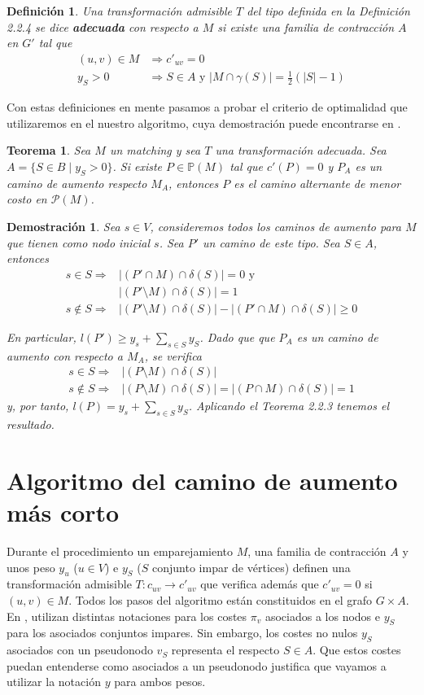 \documentclass[twoside,a4paper,openright,12pt,tikz]{book}
\newtheorem{defi}{Definici\'on}[section]
\newtheorem{thm}{Teorema}[section]
\newtheorem*{dem}{Demostración}
\begin{document}
\begin{defi}
Una transformación admisible $T$ del tipo definida en la Definición 2.2.4 se dice \textbf{adecuada} con respecto a $M$ si existe una familia de contracción $A$ en $G'$ tal que
\begin{align*}
(u,v)\in M &\Rightarrow c'_{uv} = 0\\
y_S>0&\Rightarrow S\in A \text{ y } |M\cap \gamma(S)| = \frac{1}{2}(|S|-1)
\end{align*}
\end{defi}
Con estas definiciones en mente pasamos a probar el criterio de optimalidad que utilizaremos en el nuestro algoritmo, cuya demostración puede encontrarse en \cite{derigs}.
\begin{thm}
Sea $M$ un matching y sea $T$ una transformación adecuada. Sea $A = \{S \in B\mid y_S>0\}$. Si existe $P\in \mathbb{P}(M)$ tal que $c'(P)=0$ y $P_A$ es un camino de aumento respecto $M_A$, entonces $P$ es el camino alternante de menor costo en $\mathcal{P}(M)$.
\end{thm}
\begin{dem}
Sea $s\in V$, consideremos todos los caminos de aumento para $M$ que tienen como nodo inicial $s$. Sea $P'$ un camino de este tipo. Sea $S\in A$, entonces
\begin{align*}
s\in S \Rightarrow & |(P'\cap M)\cap \delta(S)| = 0 \text{ y}\\
& |(P'\setminus M)\cap \delta(S)| = 1\\
s\notin S \Rightarrow & |(P'\setminus M)\cap \delta(S)| - |(P'\cap M)\cap \delta(S)| \geq 0
\end{align*}

En particular, $l(P')\geq y_s + \sum_{s\in S}y_S$. Dado que que $P_A$  es un camino de aumento con respecto a $M_A$, se verifica
\begin{align*}
s\in S \Rightarrow & |(P\setminus M)\cap \delta(S)|\\
s\notin S \Rightarrow & |(P\setminus M)\cap \delta(S)| = |(P\cap M)\cap \delta(S)| =1
\end{align*}
y, por tanto, $l(P) = y_s  + \sum_{s\in S} y_S$. Aplicando el Teorema 2.2.3 tenemos el resultado.
\end{dem}
\section{Algoritmo del camino de aumento más corto}
Durante el procedimiento un emparejamiento $M$, una familia de contracción $A$ y unos peso $y_u$ ($u \in V$) e $y_S$ ($S$ conjunto impar de vértices) definen una transformación admisible $T:c_{uv}\to c'_{uv}$ que verifica además que $c'_{uv}=0$ si $(u,v)\in M$. Todos los pasos del algoritmo están constituidos en el grafo $G\times A$. En \cite{inte}, utilizan distintas notaciones para los costes $\pi_v$ asociados a los nodos e $y_S$ para los asociados conjuntos impares. Sin embargo, los costes no nulos $y_S$ asociados con un pseudonodo $v_S$ representa el respecto $S\in A$. Que estos costes puedan entenderse como asociados a un pseudonodo justifica que vayamos a utilizar la notación $y$ para ambos pesos. 
\end{document}
